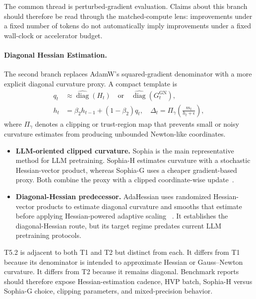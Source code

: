 The common thread is perturbed-gradient evaluation.  Claims about this branch should therefore be read through the
matched-compute lens: improvements under a fixed number of tokens do not
automatically imply improvements under a fixed wall-clock or accelerator
budget.

\paragraph{Diagonal Hessian Estimation.}
\label{sec:t5-diagonal-hessian}

The second branch replaces AdamW's squared-gradient denominator with a more
explicit diagonal curvature proxy.  A compact template is
\begin{align}
  q_t
  &\approx
  \widehat{\operatorname{diag}}(H_t)
  \quad\text{or}\quad
  \widehat{\operatorname{diag}}(G_t^{\mathrm{GN}}),\\
  h_t
  &=
  \beta_2 h_{t-1}+(1-\beta_2)q_t,\quad
  \Delta_t =
  \Pi_{\gamma}\!\left(\frac{m_t}{h_t+\epsilon}\right),
  \label{eq:t5-diagonal-curvature-template}
\end{align}
where $\Pi_{\gamma}$ denotes a clipping or trust-region map that prevents
small or noisy curvature estimates from producing unbounded Newton-like
coordinates.
\begin{itemize}
  \setlength{\itemsep}{2pt}
  \item \textbf{LLM-oriented clipped curvature.}  Sophia is the main
  representative method for LLM pretraining.  Sophia-H estimates curvature
  with a stochastic Hessian-vector product, whereas Sophia-G uses a cheaper
  gradient-based proxy.  Both combine the proxy with a clipped coordinate-wise
  update~\citep{liu2023sophia}.
  \item \textbf{Diagonal-Hessian predecessor.}  AdaHessian uses randomized
  Hessian-vector products to estimate diagonal curvature and smooths that
  estimate before applying Hessian-powered adaptive scaling
  ~\citep{yao2021adahessian}.  It establishes the diagonal-Hessian route, but
  its target regime predates current LLM pretraining protocols.
\end{itemize}

T5.2 is adjacent to both T1 and T2 but distinct from each.  It differs from T1
because its denominator is intended to approximate Hessian or Gauss--Newton
curvature.  It differs from T2 because it
remains diagonal.  Benchmark reports should therefore expose Hessian-estimation
cadence, HVP batch, Sophia-H versus Sophia-G choice, clipping parameters, and
mixed-precision behavior.

